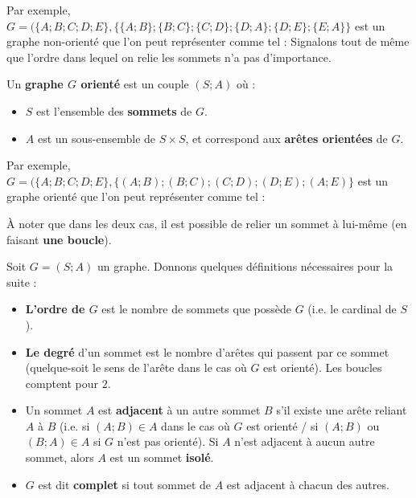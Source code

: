 	\begin{tip}[Exemple]
		\contentwidth[big]
		Par exemple, $G = (\{A; B; C; D; E\}, \{\{A; B\}; \{B; C\}; \{C; D\}; \{D; A\}; \{D; E\}; \{E; A\}\}$ est un graphe non-orienté que l'on peut représenter comme tel :
		Signalons tout de même que l'ordre dans lequel on relie les sommets n'a pas d'importance.
	\end{tip}

	\begin{formula}
		Un \textbf{graphe $G$ orienté} est un couple $(S; A)$ où :
		\begin{itemize}
			\item $S$ est l'ensemble des \textbf{sommets} de $G$.
			\item $A$ est un sous-ensemble de $S \times S$, et correspond aux \textbf{arêtes orientées} de $G$.
		\end{itemize}
	\end{formula}

	\begin{tip}[Exemple]
		\contentwidth[big]
		Par exemple, $G = (\{A; B; C; D; E\}, \{(A; B); (B; C); (C; D); (D; E); (A; E)\}$ est un graphe orienté que l'on peut représenter comme tel :
	\end{tip}

	\begin{tip}
		À noter que dans les deux cas, il est possible de relier un sommet à lui-même (en faisant \textbf{une boucle}).
	\end{tip}

	\begin{formula}[Définition]
		Soit $G = (S; A)$ un graphe. Donnons quelques définitions nécessaires pour la suite :
		\begin{itemize}
			\item \textbf{L'ordre de $G$} est le nombre de sommets que possède $G$ (i.e. le cardinal de $S$).
			\item \textbf{Le degré} d'un sommet est le nombre d'arêtes qui passent par ce sommet (quelque-soit le sens de l'arête dans le cas où $G$ est orienté). Les boucles comptent pour $2$.
			\item Un sommet $A$ est \textbf{adjacent} à un autre sommet $B$ s'il existe une arête reliant $A$ à $B$ (i.e. si $(A; B) \in A$ dans le cas où $G$ est orienté / si $(A; B)$ ou $(B; A) \in A$ si $G$ n'est pas orienté). Si $A$ n'est adjacent à aucun autre sommet, alors $A$ est un sommet \textbf{isolé}.
			\item $G$ est dit \textbf{complet} si tout sommet de $A$ est adjacent à chacun des autres.
		\end{itemize}
	\end{formula}

